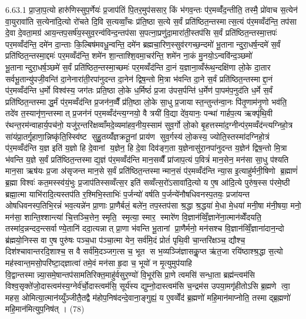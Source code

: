 6.63.1
प्रा॒जा॒प॒त्यो हारु॑णिस्सुप॒र्णेयः॑ प्र॒जाप॑तिं पि॒तर॒मुप॑ससार॒ किं भ॑गव॒न्तः प॑र॒मव्वँ॑द॒न्तीति॒ तस्मै॒ प्रो॑वाच स॒त्येन॑ वा॒युरावा॑ति स॒त्येना॑दि॒त्यो रो॑चते दि॒वि स॒त्यव्वाँ॒चः प्र॑ति॒ष्ठा स॒त्ये स॒र्वं प्रति॑ष्ठित॒न्तस्मात्स॒त्यं प॑र॒मव्वँद॑न्ति॒ तप॑सा दे॒वा दे॒वता॒मग्र॑ आय॒न्तप॒सर्\mbox{}ष॑य॒स्सुव॒रन्व॑विन्द॒न्तप॑सा स॒पत्ना॒प्रणु॑दा॒मारा॑ती॒स्तप॑सि स॒र्वं प्रति॑ष्ठित॒न्तस्मा॒त्तपः॑ पर॒मव्वँद॑न्ति॒ दमे॑न दा॒न्ताः कि॒ल्बिष॑मवधू॒न्वन्ति॒ दमे॑न ब्रह्मचा॒रिण॒स्सुव॑रगच्छ॒न्दमो॑ भू॒तानान्दुरा॒धर्\mbox{}ष॒न्दमे॑ स॒र्वं प्रति॑ष्ठित॒न्तस्मा॒द्दमः॑ पर॒मव्वँद॑न्ति॒ शमे॑न शा॒न्ताश्शि॒वमा॒चर॑न्ति॒ शमे॑न ना॒कं मु॒नयो॒ऽन्ववि॑न्द॒ञ्छमो॑ भू॒तानान्दुरा॒धर्\mbox{}ष॒ञ्छमे॑ स॒र्वं प्रति॑ष्ठित॒न्तस्मा॒च्छमः॑ पर॒मव्वँद॑न्ति दा॒नं य॒ज्ञाना॒व्वँरू॑थ॒न्दक्षि॑णा लो॒के दा॒तार सर्वभू॒तान्यु॑पजी॒वन्ति॑ दा॒नेनारा॑ती॒रपा॑नुदन्त दा॒नेन॑ द्विष॒न्तो मि॒त्रा भ॑वन्ति दा॒ने स॒र्वं प्रति॑ष्ठित॒न्तस्माद्दा॒नं प॑र॒मव्वँद॑न्ति ध॒र्मो विश्व॑स्य॒ जग॑तः प्रति॒ष्ठा लो॒के ध॒र्मिष्ठं॑ प्र॒जा उ॑पस॒र्पन्ति॑ ध॒र्मेण॑ पा॒पम॑प॒नुद॑ति ध॒र्मे स॒र्वं प्रति॑ष्ठित॒न्तस्माद्ध॒र्मं प॑र॒मव्वँद॑न्ति प्र॒जन॑न॒व्वैँ प्र॑ति॒ष्ठा लो॒के सा॒धु प्र॒जायास्त॒न्तुन्त॑न्वा॒नः पि॑तृ॒णाम॑नृ॒णो भव॑ति॒ तदे॑व त॒स्यानृ॑ण॒न्तस्मात् प्र॒जन॑नं पर॒मव्वँद॑न्त्य॒ग्नयो॒ वै त्रयी॑ वि॒द्या दे॑व॒यानः॒ पन्था॑ गार्\mbox{}हप॒त्य ऋक्पृ॑थि॒वी र॑थन्त॒रम॑न्वाहार्य॒पच॑नो॒ यजु॑र॒न्तरि॑क्षव्वाँमदे॒व्यमा॑हव॒नीय॒स्साम॑ सुव॒र्गो लो॒को बृ॒हत्तस्मा॑द॒ग्नीन्प॑र॒मव्वँद॑न्त्यग्निहो॒त्र सा॑यंप्रा॒तर्गृ॒हाणा॒न्निष्कृ॑ति॒स्स्वि॑ष्ट सुहु॒तय्यँ॑ज्ञक्रतू॒नां प्राय॑ण सुव॒र्गस्य॑ लो॒कस्य॒ ज्योति॒स्तस्मा॑दग्निहो॒त्रं प॑र॒मव्वँद॑न्ति य॒ज्ञ इति॑ य॒ज्ञो हि दे॒वानां य॒ज्ञेन॒ हि दे॒वा दिव॑ङ्ग॒ता य॒ज्ञेनासु॑रा॒नपा॑नुदन्त य॒ज्ञेन॑ द्विष॒न्तो मि॒त्रा भ॑वन्ति य॒ज्ञे स॒र्वं प्रति॑ष्ठित॒न्तस्माद्य॒ज्ञं प॑र॒मव्वँद॑न्ति मान॒सव्वैँ प्रा॑जाप॒त्यं प॒वित्रं॑ मान॒सेन॒ मन॑सा सा॒धु प॑श्यति मान॒सा ऋष॑यः प्र॒जा अ॑सृजन्त मान॒से स॒र्वं प्रति॑ष्ठित॒न्तस्मान्मान॒सं प॑र॒मव्वँद॑न्ति न्या॒स इ॒त्याहु॑र्मनी॒षिणो ब्र॒ह्माणं॑ ब्र॒ह्मा विश्वः॑ कत॒मस्स्व॑यं॒भुः प्र॒जाप॑तिस्सव्वँत्स॒र इति॑ सव्वँत्स॒रो॑ऽसावा॑दि॒त्यो य ए॒ष आ॑दि॒त्ये पुरु॑ष॒स्स प॑रमे॒ष्ठी ब्रह्मा॒त्मा याभि॑रादि॒त्यस्तप॑ति र॒श्मिभि॒स्ताभिः॑ प॒र्जन्यो॑ वर्\mbox{}षति प॒र्जन्ये॑नौषधिवनस्प॒तयः॒ प्रजा॑यन्त ओषधिवनस्प॒तिभि॒रन्नं॑ भव॒त्यन्ने॑न प्रा॒णाः प्रा॒णैर्बलं॒ बले॑न॒ तप॒स्तप॑सा श्र॒द्धा श्र॒द्धया॑ मे॒धा मे॒धया॑ मनी॒षा म॑नी॒षया॒ मनो॒ मन॑सा॒ शान्ति॒श्शान्त्या॑ चि॒त्तञ्चि॒त्तेन॒ स्मृति॒ स्मृत्या॒ स्मार॒ स्मारे॑ण वि॒ज्ञान॑व्विँ॒ज्ञाने॑ना॒त्मान॑व्वेँदयति॒ तस्मा॑द॒न्नन्दद॒न्त्सर्वाण्ये॒तानि॑ ददा॒त्यन्नात् प्रा॒णा भ॑वन्ति भू॒तानां प्रा॒णैर्मनो॒ मन॑सश्च वि॒ज्ञान॑व्विँ॒ज्ञाना॑दान॒न्दो ब्र॑ह्मयो॒निस्स वा ए॒ष पुरु॑षः पञ्च॒धा प॑ञ्चा॒त्मा येन॒ सर्व॑मि॒दं प्रोतं॑ पृथि॒वी चा॒न्तरि॑क्षञ्च॒ द्यौश्च॒ दिश॑श्चावान्तरदि॒शाश्च॒ स वै सर्व॑मि॒दञ्जग॒त्स च॒ भूत स भ॒व्यञ्जि॑ज्ञासकॢ॒प्त ऋ॑त॒जा रयि॑ष्ठाश्श्र॒द्धा स॒त्यो मह॑स्वान्त॒मसो॒परि॑ष्टा॒द्ज्ञात्वा॑ तमे॒वं मन॑सा हृ॒दा च॒ भूयो॑ न मृ॒त्युमुप॑याहि वि॒द्वान्तस्मान्न्या॒समे॒षान्तप॑सामतिरिक्त॒माहु॑र्वसुर॒ण्यो॑ वि॒भूर॑सि प्रा॒णे त्वमसि॑ सन्धा॒ता ब्रह्म॑न्त्वम॑सि विश्व॒सृक्ते॑जो॒दास्त्वम॑स्य॒ग्नेर्व॑र्चो॒दास्त्वम॑सि॒ सूर्य॑स्य द्युम्नो॒दास्त्वम॑सि च॒न्द्रम॑स उपया॒मगृ॑हीतोऽसि ब्र॒ह्मणे त्वा॒ महस॒ ओमित्या॒त्मान॑य्युँञ्जीतै॒तद्वै म॑होप॒निष॑दन्दे॒वाना॒ङ्गुह्यं॒ य ए॒वव्वेँद॑ ब्र॒ह्मणो॑ महि॒मान॑माप्नोति॒ तस्माद्ब्र॒ह्मणो॑ महि॒मान॑मित्युप॒निष॑त् । (78)
\anuvakamend


